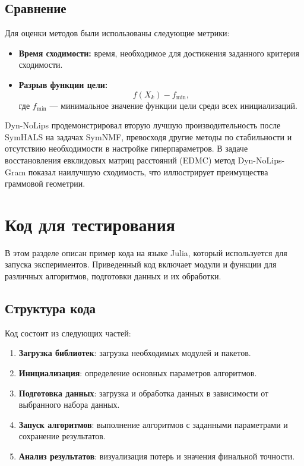 \documentclass[a4paper,11pt]{article}
\begin{document}
\subsection{Сравнение}

Для оценки методов были использованы следующие метрики:
\begin{itemize}
    \item \textbf{Время сходимости:} время, необходимое для достижения заданного критерия сходимости.
    \item \textbf{Разрыв функции цели:}
    \[
    f(X_k) - f_\text{min},
    \]
    где $f_\text{min}$ — минимальное значение функции цели среди всех инициализаций.

\end{itemize}

Dyn-NoLips продемонстрировал вторую лучшую производительность после SymHALS на задачах SymNMF,
превосходя другие методы по стабильности и отсутствию необходимости в настройке гиперпараметров.
В задаче восстановления евклидовых матриц расстояний (EDMC) метод Dyn-NoLips-Gram показал
наилучшую сходимость, что иллюстрирует преимущества граммовой геометрии.

\section{Код для тестирования}
\label{sec:testing-code}
В этом разделе описан пример кода на языке Julia, который используется для запуска экспериментов. 
Приведенный код включает модули и функции для различных алгоритмов, подготовки данных и их обработки.

\subsection{Структура кода}
\label{subsec:code-structure}
Код состоит из следующих частей:
\begin{enumerate}
    \item \textbf{Загрузка библиотек}: загрузка необходимых модулей и пакетов.
    \item \textbf{Инициализация}: определение основных параметров алгоритмов.
    \item \textbf{Подготовка данных}: загрузка и обработка данных в зависимости от выбранного набора данных.
    \item \textbf{Запуск алгоритмов}: выполнение алгоритмов с заданными параметрами и сохранение результатов.
    \item \textbf{Анализ результатов}: визуализация потерь и значения финальной точности.
\end{enumerate}
\end{document}
